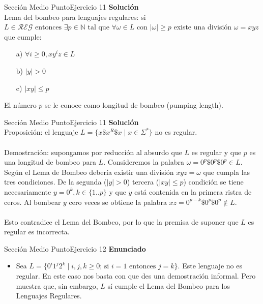 \documentclass[10pt, envcountsect, presentation, aspectratio=169]{beamer}
\begin{document}

\begin{frame}{Sección Medio Punto}{Ejercicio 11}
    \textbf{Solución}\\
    Lema del bombeo para lenguajes regulares: si $L \in \mathcal{REG} \text{ entonces } \exists p \in \mathbb{N} \text{ tal que } \forall \omega \in L \text{ con}$
    $|\omega| \geq p$ existe una división $\omega = xyz$ que cumple:
    \begin{itemize}
        \item[a)] $\forall i \geq 0, xy^iz \in L$
        \item[b)] $|y| > 0$
        \item[c)] $|xy| \leq p$  
    \end{itemize}
    El número $p$ se le conoce como longitud de bombeo (pumping length).
\end{frame}


\begin{frame}{Sección Medio Punto}{Ejercicio 11}
    \textbf{Solución}\\
    Proposición: el lenguaje $L=\{x\$x^R\$x \mid x \in \Sigma^*\}$ no es regular.\\~\\

    Demostración: supongamos por reducción al absurdo que $L$ es regular y que $p$ es una longitud de bombeo para $L$. 
    Consideremos la palabra $\omega = 0^p\$0^p\$0^p \in L$.\\
    Según el Lema de Bombeo debería existir una división $xyz=\omega$
    que cumpla las tres condiciones. De la segunda ($|y|>0$) tercera ($|xy| \leq p$) condición se tiene necesariamente $y=0^k, k \in \{1..p\}$ y que $y$ está contenida en la primera ristra de ceros.
    Al bombear $y$ cero veces se obtiene la palabra $xz = 0^{p-k}\$0^p\$0^p \notin L$.\\~\\
    Esto contradice el Lema del Bombeo, por lo que la premisa de suponer que $L$ es regular es incorrecta. 

\end{frame}


\begin{frame}{Sección Medio Punto}{Ejercicio 12}
    \textbf{Enunciado}
    \begin{itemize}
        \item Sea $L= \{ 0^i 1^j 2^k \mid i,j,k \geq0 \mbox{; si } i=1 \mbox{ entonces } j=k \} $. Este lenguaje no es regular. En este caso nos basta con que des una  demostración informal. Pero muestra que, sin embargo,  $L$ sí cumple el Lema del Bombeo para los Lenguajes Regulares.
    \end{itemize}
\end{frame}
\end{document}
